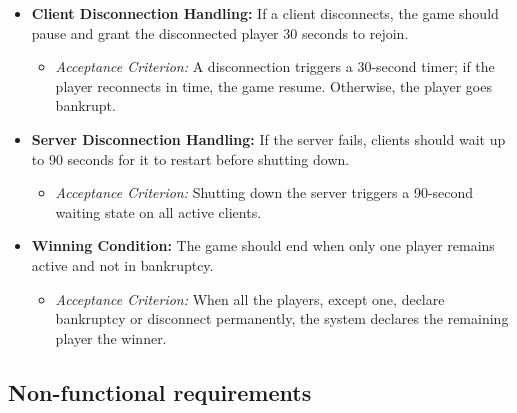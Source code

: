 \documentclass{scrartcl}
\begin{document}
\begin{itemize}
    \item \textbf{Client Disconnection Handling:} If a client disconnects, the game should pause and grant the disconnected player 30 seconds to rejoin.
    \begin{itemize}
        \item \textit{Acceptance Criterion:} A disconnection triggers a 30-second timer; if the player reconnects in time, the game resume. Otherwise, the player goes bankrupt.
    \end{itemize}

    \item \textbf{Server Disconnection Handling:} If the server fails, clients should wait up to 90 seconds for it to restart before shutting down.
    \begin{itemize}
        \item \textit{Acceptance Criterion:} Shutting down the server triggers a 90-second waiting state on all active clients.
    \end{itemize}

    \item \textbf{Winning Condition:} The game should end when only one player remains active and not in bankruptcy.
    \begin{itemize}
        \item \textit{Acceptance Criterion:} When all the players, except one, declare bankruptcy or disconnect permanently, the system declares the remaining player the winner.
    \end{itemize}
\end{itemize}

\subsection{Non-functional requirements}\label{non_functional_requirements}
\end{document}
